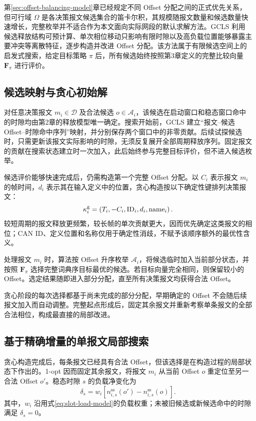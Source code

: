 \documentclass[UTF8,a4paper,twoside,zihao=-4]{ctexart}
\numberwithin{equation}{section}
\numberwithin{figure}{section}
\numberwithin{table}{section}
\theoremstyle{definition}
\newcommand{\Oset}{\mathcal{A}}
\numberwithin{algocf}{section}
\begin{document}
第\ref{sec:offset-balancing-model}章已经规定不同 Offset 分配之间的正式优先关系，但可行域 $\Omega$ 是各决策报文候选集合的笛卡尔积，其规模随报文数量和候选数量快速增长，完整枚举并不适合作为本文面向实际网段的默认求解方法。GCLS 利用候选释放结构可预计算、单次相位移动只影响有限时隙以及高负载位置能够暴露主要冲突等离散特征，逐步构造并改进 Offset 分配。该方法属于有限候选空间上的启发式搜索，给定目标策略 $\pi$ 后，所有候选始终按照第3章定义的完整比较向量 $\symbf F_{\pi}$ 进行评价。

\subsection{候选映射与贪心初始解}
\label{subsec:gcls-greedy}

对任意决策报文 $m_i\in\mathcal D$ 及合法候选 $o\in\Oset_i$，该候选在启动窗口和稳态窗口命中的时隙均由第2章的释放模型唯一确定。搜索开始前，GCLS 建立“报文--候选 Offset--时隙命中序列”映射，并分别保存两个窗口中的非零贡献。后续试探候选时，只需更新该报文实际影响的时隙，无须反复展开全部周期释放序列。固定报文的贡献在搜索状态建立时一次加入，此后始终参与完整目标评价，但不进入候选枚举。

候选评价能够快速完成后，仍需构造第一个完整 Offset 分配。以 $C_i$ 表示报文 $m_i$ 的帧时间，$d_i$ 表示其在输入定义中的位置，贪心构造按以下确定性键排列决策报文：
\begin{equation}
 \kappa_i^{\rm g}
 =
 \left(
  T_i,-C_i,\operatorname{ID}_i,d_i,\operatorname{name}_i
 \right).
\label{eq:gcls-greedy-order}
\end{equation}
较短周期的报文释放更频繁，较长帧的单次贡献更大，因而优先确定这类报文的相位；CAN ID、定义位置和名称仅用于确定性消歧，不赋予该顺序额外的最优性含义。

处理报文 $m_i$ 时，算法按 Offset 升序枚举 $\Oset_i$，将候选临时加入当前部分状态，并按照 $\symbf F_{\pi}$ 选择完整词典序目标最优的候选。若目标向量完全相同，则保留较小的 Offset。选定结果随即进入部分分配，直至所有决策报文均获得合法 Offset。

贪心阶段的每次选择都基于尚未完成的部分分配，早期确定的 Offset 不会随后续报文加入而自动调整。完整起点形成后，固定其余报文并重新考察单条报文的全部合法相位，构成最直接的局部改进。

\subsection{基于精确增量的单报文局部搜索}
\label{subsec:gcls-one-opt}

贪心构造完成后，每条报文已经具有合法 Offset，但该选择是在构造过程的局部状态下作出的。1-opt 因而固定其余报文，将报文 $m_i$ 从当前 Offset $o$ 重定位至另一合法 Offset $o'$。稳态时隙 $s$ 的负载净变化为
\begin{equation}
 \delta_s
 =
 w_i
 \left[
  n_{i,s}^{\mathrm{ss}}(o')
  -
  n_{i,s}^{\mathrm{ss}}(o)
 \right].
\label{eq:gcls-slot-load-delta}
\end{equation}
其中，$w_i$ 沿用式\eqref{eq:slot-load-model}的负载权重；未被旧候选或新候选命中的时隙满足 $\delta_s=0$。
\end{document}

